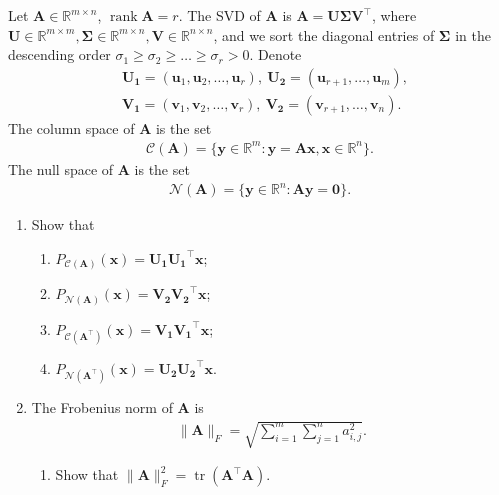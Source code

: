 \documentclass[11pt,letter,notitlepage]{article}
\begin{document}
\begin{exercise}
    Let $\mathbf{A}\in\mathbb{R}^{m\times n}$, $\operatorname{rank} \mathbf{A}=r$. The SVD of $\mathbf{A}$ is $\mathbf{A}=\mathbf{U\Sigma V}^{\top}$, where $\mathbf{U}\in \mathbb{R}^{m\times m},\mathbf{\Sigma}\in\mathbb{R}^{m\times n}, \mathbf{V}\in\mathbb{R}^{n\times n}$, and we sort the diagonal entries of $\mathbf{\Sigma}$ in the descending order $\sigma_1\geq\sigma_2\geq\ldots\geq\sigma_r>0$. Denote
    \begin{align*}
        &\mathbf{U_1}=(\mathbf{u}_{1},\mathbf{u}_{2},\ldots,\mathbf{u}_{r}),\  \mathbf{U_2}=(\mathbf{u}_{r+1},\ldots,\mathbf{u}_{m}),\\
        &\mathbf{V_1}=(\mathbf{v}_{1},\mathbf{v}_{2},\ldots,\mathbf{v}_{r}),\  \mathbf{V_2}=(\mathbf{v}_{r+1},\ldots,\mathbf{v}_{n}).
    \end{align*}
    The column space of $\mathbf{A}$ is the set 
    \begin{align*}
        \mathcal{C}(\mathbf{A}) = \{\mathbf{y}\in\mathbb{R}^m: \mathbf{y}=\mathbf{A}\mathbf{x}, \mathbf{x}\in\mathbb{R}^n\}.
    \end{align*}
    The null space of $\mathbf{A}$ is the set
    \begin{align*}
        \mathcal{N}(\mathbf{A})=\{\mathbf{y}\in\mathbb{R}^n: \mathbf{A}\mathbf{y}=\mathbf{0}\}.
    \end{align*}
    
    \begin{enumerate}
        \item Show that 
            \begin{enumerate}
                \item $P_{\mathcal{C}(\mathbf{A})}(\mathbf{x})=\mathbf{U_1U_1}^{\top}\mathbf{x}$;
                \item $P_{\mathcal{N}(\mathbf{A})}(\mathbf{x})=\mathbf{V_2V_2}^{\top}\mathbf{x}$;
                \item $P_{\mathcal{C}(\mathbf{A}^{\top})}(\mathbf{x})=\mathbf{V_1V_1}^{\top}\mathbf{x}$;
                \item $P_{\mathcal{N}(\mathbf{A}^{\top})}(\mathbf{x})=\mathbf{U_2U_2}^{\top}\mathbf{x}$.
            \end{enumerate}
            
        \item The Frobenius norm of $\mathbf{A}$ is
            \begin{align*}
                \|\mathbf{A}\|_F=\sqrt{\sum_{i=1}^m\sum_{j=1}^na_{i,j}^2}.
            \end{align*}
            \begin{enumerate}
                \item Show that $\|\mathbf{A}\|_F^2=\operatorname{tr}(\mathbf{A}^{\top}\mathbf{A})$.
                

\end{enumerate}
\end{enumerate}
\end{exercise}
\end{document}
